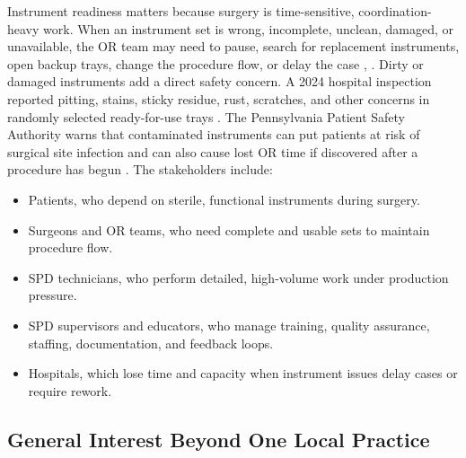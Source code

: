 \documentclass[10pt,a4paper]{article}
\begin{document}
Instrument readiness matters because surgery is time-sensitive,
coordination-heavy work. When an instrument set is wrong, incomplete, unclean,
damaged, or unavailable, the OR team may need to pause, search for replacement
instruments, open backup trays, change the procedure flow, or delay the case
\cite{nichol-et-al-2024},
\cite{pennsylvania-patient-safety-authority-2006}.
Dirty or damaged instruments add a direct safety concern. A 2024 hospital
inspection reported pitting, stains, sticky residue, rust, scratches, and other
concerns in randomly selected ready-for-use trays
\cite{association-of-health-care-journalists-2024}.
The Pennsylvania Patient Safety Authority warns that contaminated instruments
can put patients at risk of surgical site infection and can also cause lost OR
time if discovered after a procedure has begun
\cite{pennsylvania-patient-safety-authority-2006}.
The stakeholders include:
\begin{itemize}
  \item Patients, who depend on sterile, functional instruments during surgery.
  \item Surgeons and OR teams, who need complete and usable sets to maintain procedure flow.
  \item SPD technicians, who perform detailed, high-volume work under production pressure.
  \item SPD supervisors and educators, who manage training, quality assurance, staffing, documentation, and feedback loops.
  \item Hospitals, which lose time and capacity when instrument issues delay cases or require rework.
\end{itemize}
\subsection{General Interest Beyond One Local Practice}
\label{sec:general-interest-beyond-one-local-practice}
\end{document}

